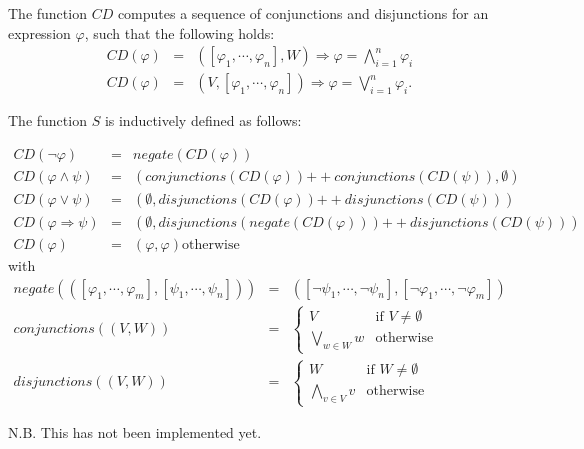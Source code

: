 \documentclass{article}
\newcommand{\concat}{\ensuremath{+\!\!+}}
\begin{document}
The function $CD$ computes a sequence of conjunctions and disjunctions for
an expression $\varphi $, such that the following holds:%
\begin{eqnarray*}
CD\left( \varphi \right) &=&\left( \left[ \varphi _{1},\cdots ,\varphi _{n}%
\right] ,W\right) \Rightarrow \varphi =\bigwedge\limits_{i=1}^{n}\varphi _{i}
\\
CD\left( \varphi \right) &=&\left( V,\left[ \varphi _{1},\cdots ,\varphi _{n}%
\right] \right) \Rightarrow \varphi =\bigvee\limits_{i=1}^{n}\varphi _{i}.
\end{eqnarray*}

The function $S$ is inductively defined as follows:

\begin{equation*}
\begin{array}{lll}
CD\left( \lnot \varphi \right) & = & negate\left( CD\left( \varphi \right)
\right) \\
CD\left( \varphi \wedge \psi \right) & = & \left( conjunctions\left(
CD\left( \varphi \right) \right) \concat conjunctions\left( CD\left( \psi
\right) \right) ,\emptyset \right) \\
CD\left( \varphi \vee \psi \right) & = & \left( \emptyset
,disjunctions\left( CD\left( \varphi \right) \right) \concat %
disjunctions\left( CD\left( \psi \right) \right) \right) \\
CD\left( \varphi \Rightarrow \psi \right) & = & \left( \emptyset
,disjunctions\left( negate(CD\left( \varphi \right) )\right) \concat %
disjunctions\left( CD\left( \psi \right) \right) \right) \\
CD\left( \varphi \right) & = & \left( \varphi ,\varphi \right) \text{
otherwise}%
\end{array}%
\end{equation*}%
with%
\begin{equation*}
\begin{array}{lll}
negate\left( \left( \left[ \varphi _{1},\cdots ,\varphi _{m}\right] ,\left[
\psi _{1},\cdots ,\psi _{n}\right] \right) \right) & = & \left( \left[ \lnot
\psi _{1},\cdots ,\lnot \psi _{n}\right] ,\left[ \lnot \varphi _{1},\cdots
,\lnot \varphi _{m}\right] \right) \\
conjunctions\left( \left( V,W\right) \right) & = & \left\{
\begin{array}{ll}
V & \text{if }V\neq \emptyset \\
\bigvee\limits_{w\in W}w & \text{otherwise}%
\end{array}%
\right. \\
disjunctions\left( \left( V,W\right) \right) & = & \left\{
\begin{array}{ll}
W & \text{if }W\neq \emptyset \\
\bigwedge\limits_{v\in V}v & \text{otherwise}%
\end{array}%
\right.%
\end{array}%
\end{equation*}

N.B. This has not been implemented yet.
\end{document}
